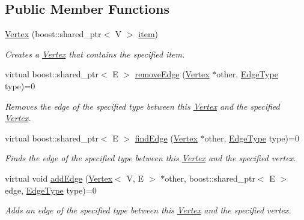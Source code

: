 \subsection*{Public Member Functions}
\begin{DoxyCompactItemize}
\item 
\hyperlink{classrepast_1_1_vertex_a4db3eb1bc334255db3e1c5256013d0aa}{Vertex} (boost\-::shared\-\_\-ptr$<$ V $>$ \hyperlink{classrepast_1_1_vertex_a55749dbe0d9f79bb39dfea7733070305}{item})
\begin{DoxyCompactList}\small\item\em Creates a \hyperlink{classrepast_1_1_vertex}{Vertex} that contains the specified item. \end{DoxyCompactList}\item 
virtual boost\-::shared\-\_\-ptr$<$ E $>$ \hyperlink{classrepast_1_1_vertex_ac3ac362e00073965fc501b2671e908eb}{remove\-Edge} (\hyperlink{classrepast_1_1_vertex}{Vertex} $\ast$other, \hyperlink{classrepast_1_1_vertex_a8b4819d648c7c0dd8b0622beea77cc14}{Edge\-Type} type)=0
\begin{DoxyCompactList}\small\item\em Removes the edge of the specified type between this \hyperlink{classrepast_1_1_vertex}{Vertex} and the specified \hyperlink{classrepast_1_1_vertex}{Vertex}. \end{DoxyCompactList}\item 
virtual boost\-::shared\-\_\-ptr$<$ E $>$ \hyperlink{classrepast_1_1_vertex_ad649f278be3161b0ee3609019341fe64}{find\-Edge} (\hyperlink{classrepast_1_1_vertex}{Vertex} $\ast$other, \hyperlink{classrepast_1_1_vertex_a8b4819d648c7c0dd8b0622beea77cc14}{Edge\-Type} type)=0
\begin{DoxyCompactList}\small\item\em Finds the edge of the specified type between this \hyperlink{classrepast_1_1_vertex}{Vertex} and the specified vertex. \end{DoxyCompactList}\item 
virtual void \hyperlink{classrepast_1_1_vertex_a16e732188e59b29be343b96a5377533c}{add\-Edge} (\hyperlink{classrepast_1_1_vertex}{Vertex}$<$ V, E $>$ $\ast$other, boost\-::shared\-\_\-ptr$<$ E $>$ edge, \hyperlink{classrepast_1_1_vertex_a8b4819d648c7c0dd8b0622beea77cc14}{Edge\-Type} type)=0
\begin{DoxyCompactList}\small\item\em Adds an edge of the specified type between this \hyperlink{classrepast_1_1_vertex}{Vertex} and the specified vertex. \end{DoxyCompactList}\item 

\end{DoxyCompactItemize}
